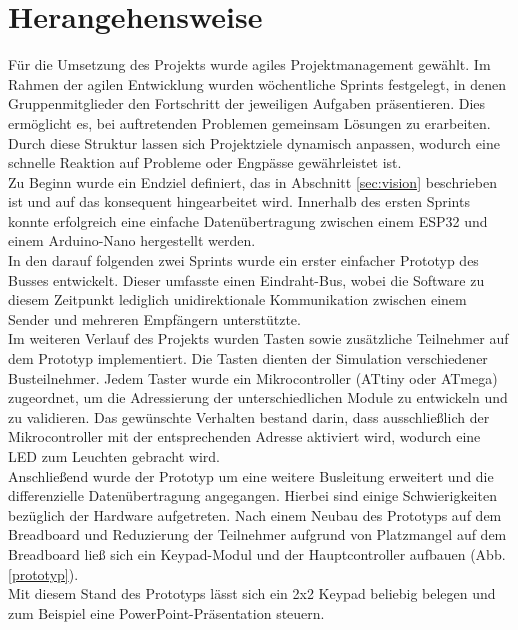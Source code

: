 \section{Herangehensweise}
Für die Umsetzung des Projekts wurde agiles Projektmanagement gewählt. Im Rahmen der agilen Entwicklung wurden wöchentliche Sprints festgelegt, in denen Gruppenmitglieder den Fortschritt der jeweiligen Aufgaben präsentieren. Dies ermöglicht es, bei auftretenden Problemen gemeinsam Lösungen zu erarbeiten. Durch diese Struktur lassen sich Projektziele dynamisch anpassen, wodurch eine schnelle Reaktion auf Probleme oder Engpässe gewährleistet ist.\\

Zu Beginn wurde ein Endziel definiert, das in Abschnitt \ref{sec:vision} beschrieben ist und auf das konsequent hingearbeitet wird. Innerhalb des ersten Sprints konnte erfolgreich eine einfache Datenübertragung zwischen einem ESP32 und einem Arduino-Nano hergestellt werden.\\

In den darauf folgenden zwei Sprints wurde ein erster einfacher Prototyp des Busses entwickelt. Dieser umfasste einen Eindraht-Bus, wobei die Software zu diesem Zeitpunkt lediglich unidirektionale Kommunikation zwischen einem Sender und mehreren Empfängern unterstützte.\\

Im weiteren Verlauf des Projekts wurden Tasten sowie zusätzliche Teilnehmer auf dem Prototyp implementiert. Die Tasten dienten der Simulation verschiedener Busteilnehmer. Jedem Taster wurde ein Mikrocontroller (ATtiny oder ATmega) zugeordnet, um die Adressierung der unterschiedlichen Module zu entwickeln und zu validieren. Das gewünschte Verhalten bestand darin, dass ausschließlich der Mikrocontroller mit der entsprechenden Adresse aktiviert wird, wodurch eine LED zum Leuchten gebracht wird.\\

Anschließend wurde der Prototyp um eine weitere Busleitung erweitert und die differenzielle Datenübertragung angegangen. Hierbei sind einige Schwierigkeiten bezüglich der Hardware aufgetreten. Nach einem Neubau des Prototyps auf dem Breadboard und Reduzierung der Teilnehmer aufgrund von Platzmangel auf dem Breadboard ließ sich ein Keypad-Modul und der Hauptcontroller aufbauen (Abb. \ref{prototyp}). \\
Mit diesem Stand des Prototyps lässt sich ein 2x2 Keypad beliebig belegen und zum Beispiel eine PowerPoint-Präsentation steuern.

